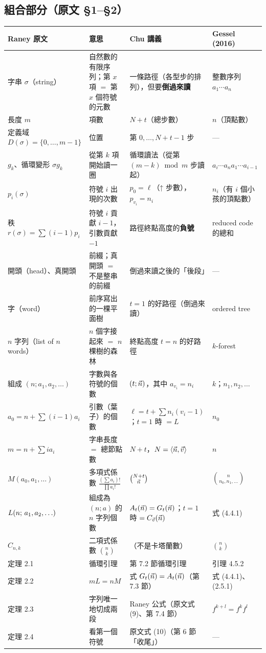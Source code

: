 \subsection{組合部分（原文 §1--§2）}

{\small
\renewcommand{\arraystretch}{1.25}
\begin{longtable}{@{}>{\raggedright}p{3.1cm}>{\raggedright}p{3.9cm}>{\raggedright}p{4.1cm}>{\raggedright\arraybackslash}p{3.6cm}@{}}
\toprule
Raney 原文 & 意思 & Chu 講義 & Gessel (2016)\\
\midrule
\endhead
字串 $\sigma$（string） & 自然數的有限序列；第 $x$ 項 $=$ 第 $x$ 個符號的元數 & 一條路徑（各型步的排列），但要\textbf{倒過來讀} & 整數序列 $a_1\cdots a_n$\\
長度 $m$ & 項數 & $N+t$（總步數） & $n$（頂點數）\\
定義域 $D(\sigma)=\{0,\ldots,m-1\}$ & 位置 & 第 $0,\ldots,N+t-1$ 步 & —\\
$g_k$、循環變形 $\sigma g_k$ & 從第 $k$ 項開始讀一圈 & 循環讀法（從第 $(m-k)\bmod m$ 步讀起） & $a_i\cdots a_na_1\cdots a_{i-1}$\\
$p_i(\sigma)$ & 符號 $i$ 出現的次數 & $p_0=\ell$（↑ 步數），$p_{v_i}=n_i$ & $n_i$（有 $i$ 個小孩的頂點數）\\
秩 $r(\sigma)=\sum(i-1)p_i$ & 符號 $i$ 貢獻 $i-1$，引數貢獻 $-1$ & 路徑終點高度的\textbf{負號} & reduced code 的總和\\
開頭（head）、真開頭 & 前綴；真開頭 $=$ 不是整串的前綴 & 倒過來讀之後的「後段」 & —\\
字（word） & 前序寫出的一棵平面樹 & $t=1$ 的好路徑（倒過來讀） & ordered tree\\
$n$ 字列（list of $n$ words） & $n$ 個字接起來 $=$ $n$ 棵樹的森林 & 終點高度 $t=n$ 的好路徑 & $k$-forest\\
組成 $(n;a_1,a_2,\ldots)$ & 字數與各符號的個數 & $(t;\vec n)$，其中 $a_{v_i}=n_i$ & $k$；$n_1,n_2,\ldots$\\
$a_0=n+\sum(i-1)a_i$ & 引數（葉子）的個數 & $\ell=t+\sum n_i(v_i-1)$；$t=1$ 時 $=L$ & $n_0$\\
$m=n+\sum ia_i$ & 字串長度 $=$ 總節點數 & $N+t$，$N=\langle \vec n,\vec v\rangle$ & $n$\\
$M(a_0,a_1,\ldots)$ & 多項式係數 $\frac{(\sum a_i)!}{\prod a_i!}$ & $\binom{N+t}{\vec n}$ & $\binom{n}{n_0,n_1,\ldots}$\\
$L(n;\,a_1,a_2,\ldots)$ & 組成為 $(n;a)$ 的 $n$ 字列個數 & $A_t(\vec n)=G_t(\vec n)$；$t=1$ 時 $=C_{\vec v}(\vec n)$ & 式 (4.4.1)\\
$C_{n,k}$ & 二項式係數 $\binom nk$ & （不是卡塔蘭數） & $\binom nk$\\
定理 2.1 & 循環引理 & 第 7.2 節循環引理 & 引理 4.5.2\\
定理 2.2 & $mL=nM$ & 式 $G_t(\vec n)=A_t(\vec n)$（第 7.3 節） & 式 (4.4.1)、(2.5.1)\\
定理 2.3 & 字列唯一地切成兩段 & Raney 公式（原文式 (9)、第 7.4 節） & $f^{k+l}=f^kf^l$\\
定理 2.4 & 看第一個符號 & 原文式 (10)（第 6 節「收尾」） & —\\
\bottomrule
\end{longtable}
}

